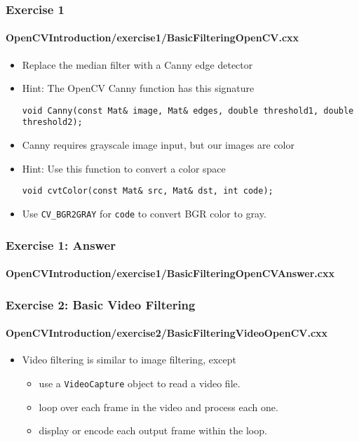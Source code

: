 \begin{frame}[fragile]
\frametitle{Exercise 1}
\framesubtitle{OpenCVIntroduction/exercise1/BasicFilteringOpenCV.cxx}
\begin{center}
\begin{itemize}
\item Replace the median filter with a Canny edge detector
\pause
\item Hint: The OpenCV Canny function has this signature
\begin{lstlisting}[numbers=none,xleftmargin=0pt]
void Canny(const Mat& image, Mat& edges, double threshold1, double threshold2);
\end{lstlisting}
\pause
\item Canny requires grayscale image input, but our images are color
\item Hint: Use this function to convert a color space
\begin{lstlisting}[numbers=none,xleftmargin=0pt]
void cvtColor(const Mat& src, Mat& dst, int code);
\end{lstlisting}
\item Use {\tt CV\_BGR2GRAY} for {\tt code} to convert BGR color to gray.
\end{itemize}
\end{center}
\end{frame}


\begin{frame}
\frametitle{Exercise 1: Answer}
\framesubtitle{OpenCVIntroduction/exercise1/BasicFilteringOpenCVAnswer.cxx}
\begin{center}
\begin{itemize}
\end{itemize}
\end{center}
\end{frame}


\begin{frame}
\frametitle{Exercise 2: Basic Video Filtering}
\framesubtitle{OpenCVIntroduction/exercise2/BasicFilteringVideoOpenCV.cxx}
\begin{center}
\begin{itemize}
\item Video filtering is similar to image filtering, except
  \begin{itemize}
  \item use a {\tt VideoCapture} object to read a video file.
  \item loop over each frame in the video and process each one.
  \item display or encode each output frame within the loop.
  \end{itemize}
\end{itemize}
\end{center}
\end{frame}


